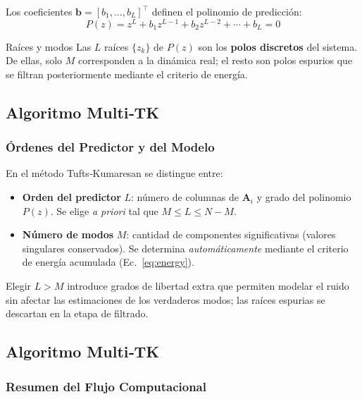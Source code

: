 Los coeficientes $\mathbf{b}=[b_1,\dots,b_L]^\top$ definen el polinomio de  predicción:
\begin{equation}
    P(z) = z^L + b_1 z^{L-1} + b_2 z^{L-2} + \cdots + b_L = 0
    \label{eq:pred_poly}
\end{equation}

\begin{exampleblock}{Raíces y modos}
    Las $L$ raíces $\{z_k\}$ de $P(z)$ son los \textbf{polos discretos} del sistema.
    De ellas, solo $M$ corresponden a la dinámica real; el resto son polos
    espurios que se filtran posteriormente mediante el criterio de energía.
\end{exampleblock}

\subsection{Algoritmo Multi‑TK}
\subsubsection{Órdenes del Predictor y del Modelo}

En el método Tufts‑Kumaresan se distingue entre:
\begin{itemize}
    \item \textbf{Orden del predictor} $L$: número de columnas de $\mathbf{A}_i$ y
          grado del polinomio $P(z)$. Se elige \emph{a priori} tal que
          $M \le L \le N-M$.
    \item \textbf{Número de modos} $M$: cantidad de componentes significativas
          (valores singulares conservados). Se determina \emph{automáticamente}
          mediante el criterio de energía acumulada (Ec.~\ref{eq:energy}).
\end{itemize}

Elegir $L > M$ introduce grados de libertad extra que permiten modelar el
ruido sin afectar las estimaciones de los verdaderos modos; las raíces
espurias se descartan en la etapa de filtrado.

\subsection{Algoritmo Multi‑TK}
\subsubsection{Resumen del Flujo Computacional}

